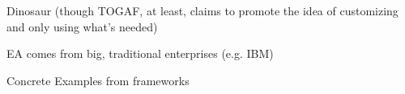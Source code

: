 Dinosaur (though TOGAF, at least, claims to promote the idea of customizing and only using what's needed)
    
    EA comes from big, traditional enterprises  (e.g. IBM)
    
    Concrete Examples from frameworks